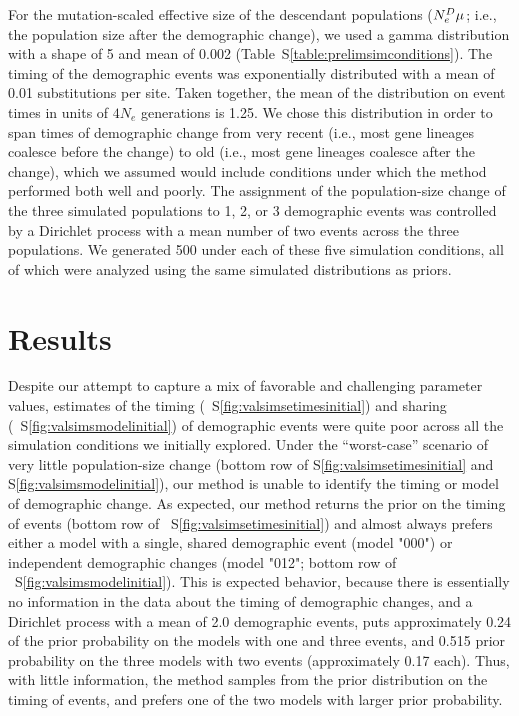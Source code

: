 For the mutation-scaled effective size of the descendant populations
($\epopsize[\descendantpopindex{}]\murate$; i.e., the population size after the
demographic change),
we used a gamma distribution with a shape of 5 and mean of 0.002
(Table~S\ref{table:prelimsimconditions}).
The timing of the demographic events was exponentially distributed with a mean
of 0.01 substitutions per site.
Taken together, the mean of the distribution on event times in units of $4N_e$
generations is 1.25.
We chose this distribution in order to span times of demographic change from
very recent (i.e., most gene lineages coalesce before the change) to old (i.e.,
most gene lineages coalesce after the change),
which we assumed would include conditions under which the method performed both
well and poorly.
The assignment of the population-size change of the three simulated populations
to 1, 2, or 3 demographic events was controlled by a Dirichlet process with a
mean number of two events across the three populations.
We generated 500 \datasets under each of these five simulation conditions, all
of which were analyzed using the same simulated distributions as priors.

\section{Results}
Despite our attempt to capture a mix of favorable and challenging parameter
values,
estimates of the timing
(\fig{}~S\ref{fig:valsimsetimesinitial})
and sharing
(\fig{}~S\ref{fig:valsimsmodelinitial})
of demographic events were quite poor across all the simulation conditions
we initially explored.
Under the ``worst-case'' scenario of very little population-size change
(bottom row of \figs S\ref{fig:valsimsetimesinitial} and
S\ref{fig:valsimsmodelinitial}),
our method is unable to identify the timing or model of demographic change.
As expected, our method returns the prior on the timing of events
(bottom row of \fig{}~S\ref{fig:valsimsetimesinitial})
and almost always prefers either a model with a single, shared demographic
event (model "000") or independent demographic changes (model "012";
bottom row of \fig{}~S\ref{fig:valsimsmodelinitial}).
This is expected behavior, because there is essentially no information in the
data about the timing of demographic changes, and a Dirichlet process with a
mean of 2.0 demographic events, puts approximately 0.24 of the prior
probability on the models with one and three events, and 0.515 prior
probability on the three models with two events (approximately 0.17 each).
Thus, with little information, the method samples from the prior distribution
on the timing of events, and prefers one of the two models with larger prior
probability.

